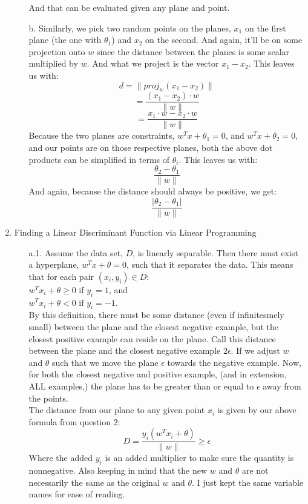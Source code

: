 \begin{enumerate}
\begin{enumerate}
			And that can be evaluated given any plane and point.
		\item[b.]
			Similarly, we pick two random points on the planes, $x_1$ on the first plane (the one with $\theta _1$) and $x_2$ on the second. And again, it'll be on some projection onto $w$ since the distance between the planes is some scalar multiplied by $w$. And what we project is the vector $x_1-x_2$. This leaves us with:
			$$d=\|proj_{w}(x_1-x_2)\|$$
			$$=\frac{(x_1-x_2)\cdot w}{\|w\|}$$
			$$=\frac{x_1 \cdot w - x_2 \cdot w}{\|w\|}$$
			Because the two planes are constraints, $w^T x + \theta _1 = 0$, and $w^T x + \theta _2 = 0$, and our points are on those respective planes, both the above dot products can be simplified in terms of $\theta _i$. This leaves us with:
			$$\frac{\theta _2 - \theta _1}{\|w\|}$$
			And again, because the distance should always be positive, we get:
			$$\frac{|\theta _2 - \theta _1|}{\|w\|}$$
	\end{enumerate}
\item Finding a Linear Discriminant Function via Linear Programming
      \begin{enumerate}
        \item[a.1.]
                Assume the data set, $D$, is linearly separable. Then there must exist a hyperplane, $w^Tx+\theta=0$, such that it separates the data. This means that for each pair $(x_i,y_i) \in D$:\\
                $w^Tx_i+\theta \geq 0$ if $y_i = 1$, and \\ 
                $w^Tx_i+\theta < 0$ if $y_i = -1$. \\
                By this definition, there must be some distance (even if infinitesmely small) between the plane and the closest negative example, but the closest positive example can reside on the plane. Call this distance between the plane and the closest negative example $2\epsilon$. If we adjust $w$ and $\theta$ such that we move the plane $\epsilon$ towards the negative example. Now, for both the closest negative and positive example, (and in extension, ALL examples,) the plane has to be greater than or equal to $\epsilon$ away from the points.\\
                The distance from our plane to any given point $x_i$ is given by our above formula from question 2:
                $$D = \frac{y_i(w^Tx_i+\theta)}{\|w\|} \geq \epsilon$$
                Where the added $y_i$ is an added multiplier to make sure the quantity is nonnegative. Also keeping in mind that the new $w$ and $\theta$ are not necessarily the same as the original $w$ and $\theta$. I just kept the same variable names for ease of reading.\\\\

\end{enumerate}
\end{enumerate}
